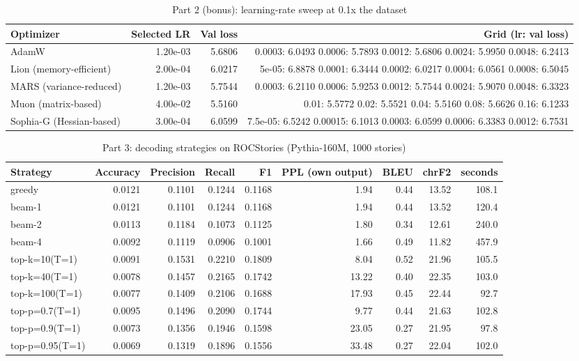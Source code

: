 \begin{table}[htbp]
  \centering
  \caption{Part 2 (bonus): learning-rate sweep at 0.1x the dataset}
  \label{tab:part2_sweep}
  \begin{tabular}{lrrr}
    \toprule
    Optimizer & Selected LR & Val loss & Grid (lr: val loss) \\
    \midrule
    AdamW & 1.20e-03 & 5.6806 & 0.0003: 6.0493  0.0006: 5.7893  0.0012: 5.6806  0.0024: 5.9950  0.0048: 6.2413 \\
    Lion (memory-efficient) & 2.00e-04 & 6.0217 & 5e-05: 6.8878  0.0001: 6.3444  0.0002: 6.0217  0.0004: 6.0561  0.0008: 6.5045 \\
    MARS (variance-reduced) & 1.20e-03 & 5.7544 & 0.0003: 6.2110  0.0006: 5.9253  0.0012: 5.7544  0.0024: 5.9070  0.0048: 6.3323 \\
    Muon (matrix-based) & 4.00e-02 & 5.5160 & 0.01: 5.5772  0.02: 5.5521  0.04: 5.5160  0.08: 5.6626  0.16: 6.1233 \\
    Sophia-G (Hessian-based) & 3.00e-04 & 6.0599 & 7.5e-05: 6.5242  0.00015: 6.1013  0.0003: 6.0599  0.0006: 6.3383  0.0012: 6.7531 \\
    \bottomrule
  \end{tabular}
\end{table}

\begin{table}[htbp]
  \centering
  \caption{Part 3: decoding strategies on ROCStories (Pythia-160M, 1000 stories)}
  \label{tab:part3_main}
  \begin{tabular}{lrrrrrrrr}
    \toprule
    Strategy & Accuracy & Precision & Recall & F1 & PPL (own output) & BLEU & chrF2 & seconds \\
    \midrule
    greedy & 0.0121 & 0.1101 & 0.1244 & 0.1168 & 1.94 & 0.44 & 13.52 & 108.1 \\
    beam-1 & 0.0121 & 0.1101 & 0.1244 & 0.1168 & 1.94 & 0.44 & 13.52 & 120.4 \\
    beam-2 & 0.0113 & 0.1184 & 0.1073 & 0.1125 & 1.80 & 0.34 & 12.61 & 240.0 \\
    beam-4 & 0.0092 & 0.1119 & 0.0906 & 0.1001 & 1.66 & 0.49 & 11.82 & 457.9 \\
    top-k=10(T=1) & 0.0091 & 0.1531 & 0.2210 & 0.1809 & 8.04 & 0.52 & 21.96 & 105.5 \\
    top-k=40(T=1) & 0.0078 & 0.1457 & 0.2165 & 0.1742 & 13.22 & 0.40 & 22.35 & 103.0 \\
    top-k=100(T=1) & 0.0077 & 0.1409 & 0.2106 & 0.1688 & 17.93 & 0.45 & 22.44 & 92.7 \\
    top-p=0.7(T=1) & 0.0095 & 0.1496 & 0.2090 & 0.1744 & 9.77 & 0.44 & 21.63 & 102.8 \\
    top-p=0.9(T=1) & 0.0073 & 0.1356 & 0.1946 & 0.1598 & 23.05 & 0.27 & 21.95 & 97.8 \\
    top-p=0.95(T=1) & 0.0069 & 0.1319 & 0.1896 & 0.1556 & 33.48 & 0.27 & 22.04 & 102.0 \\
    \bottomrule
  \end{tabular}
\end{table}

